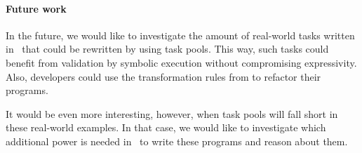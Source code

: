 \paragraph{Future work}
\label{sec:future-work}

In the future, we would like to investigate the amount of real-world tasks written in \ITASKS\ that could be rewritten by using task pools.
This way, such tasks could benefit from validation by symbolic execution without compromising expressivity.
Also, developers could use the transformation rules from \citet{conf/sfp/KlijnsmaS22} to refactor their programs.

It would be even more interesting, however, when task pools will fall short in these real-world examples.
In that case, we would like to investigate which additional power is needed in \TOPHAT\ to write these programs and reason about them.